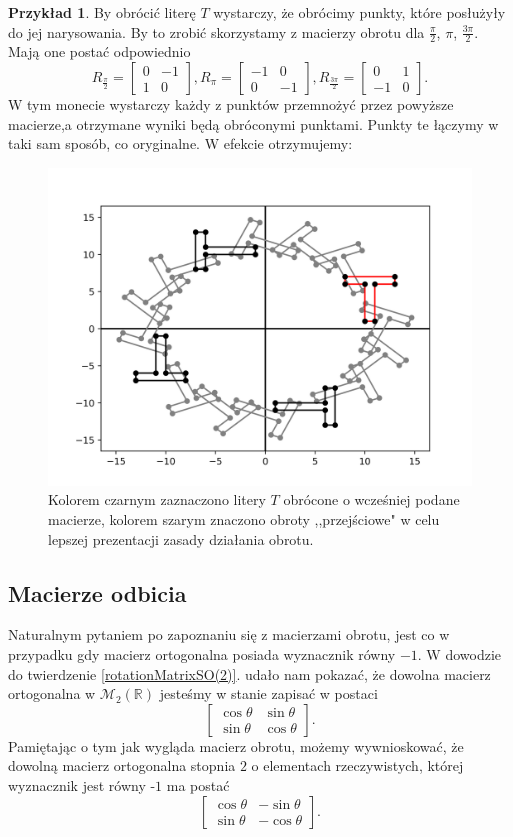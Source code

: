 \documentclass[a4paper,twoside,11pt,reqno]{mwrep}
\theoremstyle{plain} \newtheorem{twr}{Twierdzenie}
\theoremstyle{plain} \newtheorem{lem}{Lemat}
\theoremstyle{definition} \newtheorem{defi}{Definicja}
\theoremstyle{remark} \newtheorem*{wni}{Wniosek}
\theoremstyle{definition} \newtheorem{uwaga}{Uwaga}
\theoremstyle{definition}\newtheorem{prz}{Przykład}
\begin{document}
\begin{prz}
By obrócić literę $T$ wystarczy, że obrócimy punkty, które posłużyły do jej narysowania.
By to zrobić skorzystamy z macierzy obrotu dla  $\frac{\pi}{2}$, $\pi$, $\frac{3\pi}{2}$.
Mają one postać odpowiednio
$$R_\frac{\pi}{2}=\begin{bmatrix}
0&-1 \\
1&0 
\end{bmatrix},
R_\pi=\begin{bmatrix}
-1&0 \\
0&-1 
\end{bmatrix},
R_\frac{3\pi}{2}=\begin{bmatrix}
0&1 \\
-1&0 
\end{bmatrix}.
$$
W tym monecie wystarczy każdy z punktów przemnożyć przez powyższe macierze,a otrzymane wyniki będą 
obróconymi punktami. Punkty te łączymy w taki sam sposób, co oryginalne. W efekcie otrzymujemy:
\begin{figure}[h]
\begin{center}
\includegraphics[width=7 cm]{T_obroty.png}
\caption{Kolorem czarnym zaznaczono litery $T$ obrócone o wcześniej podane macierze, kolorem szarym znaczono
obroty ,,przejściowe" w celu lepszej prezentacji zasady działania obrotu.}
\end{center}
\end{figure}
\end{prz}


\subsection{Macierze odbicia}
Naturalnym pytaniem po zapoznaniu się z macierzami obrotu, jest co w przypadku gdy macierz
ortogonalna posiada wyznacznik równy $-1$. W dowodzie do twierdzenie \ref{rotationMatrixSO(2)}.
udało nam pokazać, że dowolna macierz ortogonalna w $\mathcal{M}_2(\mathbb{R})$ jesteśmy 
w stanie zapisać w postaci
$$\begin{bmatrix}
\cos\theta&\sin\theta \\
\sin\theta & \cos\theta
\end{bmatrix}.$$
Pamiętając o tym jak wygląda macierz obrotu, możemy wywnioskować, że dowolną macierz 
ortogonalna stopnia $2$ o elementach rzeczywistych, której wyznacznik jest równy -$1$ ma postać
$$\begin{bmatrix}
\cos\theta&-\sin\theta \\
\sin\theta & -\cos\theta
\end{bmatrix}.$$
\end{document}

